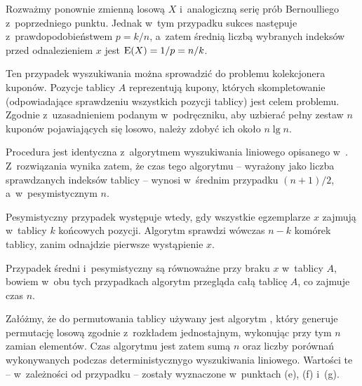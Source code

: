 \subproblem %
Rozważmy ponownie zmienną losową $X$ i~analogiczną serię prób Bernoulliego z~poprzedniego punktu. Jednak w~tym przypadku sukces następuje z~prawdopodobieństwem $p=k/n$, a~zatem średnią liczbą wybranych indeksów przed odnalezieniem $x$ jest $\operatorname{E}(X)=1/p=n/k$.

\subproblem %
Ten przypadek wyszukiwania można sprowadzić do problemu kolekcjonera kuponów. Pozycje tablicy $A$ reprezentują kupony, których skompletowanie (odpowiadające sprawdzeniu wszystkich pozycji tablicy) jest celem problemu. Zgodnie z~uzasadnieniem podanym w~podręczniku, aby uzbierać pełny zestaw $n$ kuponów pojawiających się losowo, należy zdobyć ich około $n\lg n$.

\subproblem %
Procedura  jest identyczna z~algorytmem wyszukiwania liniowego opisanego w~. Z~rozwiązania  wynika zatem, że czas tego algorytmu -- wyrażony jako liczba sprawdzanych indeksów tablicy -- wynosi w~średnim przypadku $(n+1)/2$, a~w~pesymistycznym $n$.

\subproblem %


Pesymistyczny przypadek występuje wtedy, gdy wszystkie egzemplarze $x$ zajmują w~tablicy $k$ końcowych pozycji. Algorytm sprawdzi wówczas $n-k$ komórek tablicy, zanim odnajdzie pierwsze wystąpienie $x$.

\subproblem %
Przypadek średni i~pesymistyczny są równoważne przy braku $x$ w~tablicy $A$, bowiem w~obu tych przypadkach algorytm przegląda całą tablicę $A$, co zajmuje czas $n$.

\subproblem %
Załóżmy, że do permutowania tablicy używany jest algorytm , który generuje permutację losową zgodnie z~rozkładem jednostajnym, wykonując przy tym $n$ zamian elementów. Czas algorytmu  jest zatem sumą $n$ oraz liczby porównań wykonywanych podczas deterministycznygo wyszukiwania liniowego. Wartości te -- w~zależności od przypadku -- zostały wyznaczone w~punktach (e), (f) i~(g).

